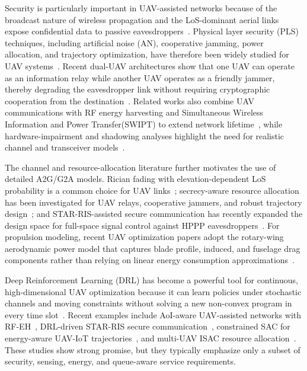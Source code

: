 \documentclass[journal]{IEEEtran}
\begin{document}
Security is particularly important in UAV-assisted networks because of the broadcast nature of wireless propagation and the LoS-dominant aerial links expose confidential data to passive eavesdroppers~\cite{pandey2022security, sun2019pls, wu2019safeguarding}. Physical layer security (PLS) techniques, including artificial noise (AN), cooperative jamming, power allocation, and trajectory optimization, have therefore been widely studied for UAV systems~\cite{wang2020energysecure, zhang2021dualuavdata, diao2022noma}. Recent dual-UAV architectures show that one UAV can operate as an information relay while another UAV operates as a friendly jammer, thereby degrading the eavesdropper link without requiring cryptographic cooperation from the destination~\cite{pandeydualuav2026, pandeyrobust2025, kang2022dualuav}. Related works also combine UAV communications with RF energy harvesting and Simultaneous Wireless Information and Power Transfer(SWIPT) to extend network lifetime~\cite{perera2018swipt, pandey2025rfeh, pandeyswiptjam2025}, while hardware-impairment and shadowing analyses highlight the need for realistic channel and transceiver models~\cite{pandeyiot2023, pandeyrfehiot2025}.

The channel and resource-allocation literature further motivates the use of detailed A2G/G2A models. Rician fading with elevation-dependent LoS probability is a common choice for UAV links~\cite{khuwaja2018survey, pandeyaoidrl2025}; secrecy-aware resource allocation has been investigated for UAV relays, cooperative jammers, and robust trajectory design~\cite{xu2021secureuav, wang2021robust3d, gao2024roleswitching}; and STAR-RIS-assisted secure communication has recently expanded the design space for full-space signal control against HPPP eavesdroppers~\cite{pandeystarris2026}. For propulsion modeling, recent UAV optimization papers adopt the rotary-wing aerodynamic power model that captures blade profile, induced, and fuselage drag components rather than relying on linear energy consumption approximations~\cite{zeng2019energy, pandeydualuav2026, pandeyaoidrl2025}.

Deep Reinforcement Learning (DRL) has become a powerful tool for continuous, high-dimensional UAV optimization because it can learn policies under stochastic channels and moving constraints without solving a new non-convex program in every time slot~\cite{haarnoja2018sac, bai2023marluav}. Recent examples include AoI-aware UAV-assisted networks with RF-EH~\cite{pandeyaoidrl2025}, DRL-driven STAR-RIS secure communication~\cite{pandeystarris2026}, constrained SAC for energy-aware UAV-IoT trajectories~\cite{zhou2022csac}, and multi-UAV ISAC resource allocation~\cite{zhang2023drlisac}. These studies show strong promise, but they typically emphasize only a subset of security, sensing, energy, and queue-aware service requirements.
\end{document}

